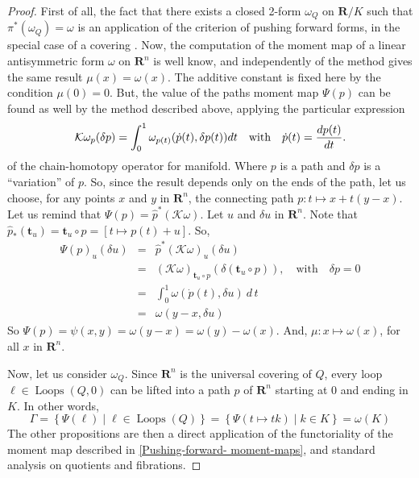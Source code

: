 \documentclass[10pt,reqno,twoside]{amsart}
\newcommand{\qmbox}[1]{\quad\mbox{#1}\quad}
\newcommand{\RR}{\mathbf{R}}
\newcommand{\cK}{\mathcal{K}}
\DeclareMathOperator{\Loops}{Loops}
\newcommand{\et}{\mathbf{t}}
\theoremstyle{plain}
\theoremstyle{definition}
\begin{document}
  \begin{proof}
    First of all,
    the fact that there exists a closed 2-form $\omega_Q$ on $\RR/K$ such that $\pi^*(\omega_Q) =\omega$ is an application of the criterion of pushing forward forms,
    in the special case of a covering \cite{Piz05}.
    Now,
    the computation of the moment map of a linear antisymmetric form $\omega$ on $\RR^n$ is well know,
    and independently of the method gives the same result $\mu(x) = \omega(x)$.
    The additive constant is fixed here by the condition $\mu(0)=0$.
    But,
    the value of the paths moment map $\Psi(p)$ can be found as well by the method described above,
    applying the particular expression
    $$
      \cK\omega_p(\delta p) = \int_0^1 \omega_{p(t)}(\dot p(t),\delta p(t)) dt \qmbox{with} \dot p(t) ={d p(t) \over dt}.
      $$
    of the chain-homotopy operator for manifold.
    Where $p$ is a path and $\delta p$ is a ``variation'' of $p$.
    So,
    since the result depends only on the ends of the path,
    let us choose,
    for any points $x$ and $y$ in $\RR^n$,
    the connecting path $p : t \mapsto x + t(y-x)$.
    Let us remind that $\Psi(p) = \hat p^*(\cK\omega)$.
    Let $u$ and $\delta u$ in $\RR^n$.
    Note that $\hat p_*(\et_u) = \et_u \circ p = [t \mapsto p(t) + u]$.
    So,
    \begin{eqnarray*}
      \Psi(p)_u(\delta u) & = & \hat p^*(\cK\omega)_u(\delta u) \\
      & = & ({\cK}\omega)_{\et_u \circ p} (\delta(\et_u \circ p)), \qmbox{with} \delta p = 0 \\
      & = & \int_0^1 \omega(\dot p(t), \delta u) \ d\, t \\ & = & \omega(y-x,\delta u)
    \end{eqnarray*}
    So $\Psi(p) = \psi(x,y) = \omega(y-x)= \omega(y) - \omega(x)$.
    And,
    $\mu : x \mapsto \omega(x)$,
    for all $x$ in $\RR^n$.
    
    Now,
    let us consider $\omega_Q$.
    Since $\RR^n$ is the universal covering of $Q$,
    every loop $\ell \in \Loops(Q,0)$ can be lifted into a path $p$ of $\RR^n$ starting at $0$ and ending in $K$.
    In other words,
    $$
      \Gamma = \left\{ \Psi (\ell) \mid \ell \in \Loops(Q) \right\} = \left\{ \Psi (t \mapsto tk) \mid k \in K \right\} = \omega (K)
      $$
    The other propositions are then a direct application of the functoriality of the moment map described in \ref{Pushing-forward- moment-maps},
    and standard analysis on quotients and fibrations.
  \end{proof}
  
\end{document}
